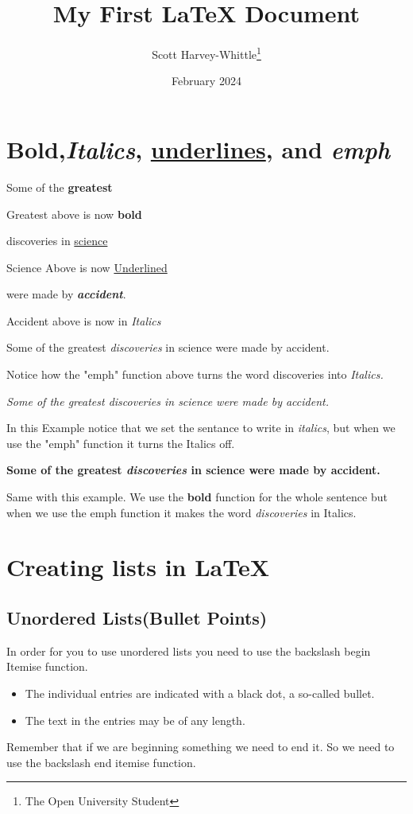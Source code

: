 \documentclass[12pt,a4paper]{article}
\title{My First \LaTeX{} Document}
\author{Scott Harvey-Whittle\thanks {The Open University Student}}
\date{February 2024}
\begin{document}
\maketitle

\section{\textbf{Bold},\textit{Italics}, \underline{underlines}, and \emph{emph}}
Some of the \textbf{greatest}

Greatest above is now \textbf{bold} 

discoveries in \underline{science} 

Science Above is now \underline{Underlined}

were made by \textbf{\textit{accident}}.

Accident above is now in \textit{Italics}


Some of the greatest \emph{discoveries} in science 
were made by accident.

Notice how the "emph" function above turns the word discoveries into  \emph{Italics.}

\textit{Some of the greatest \emph{discoveries} 
in science were made by accident.}

In this Example notice that we set the sentance to write in \textit{italics}, but when we use the "emph" function it turns the Italics off. 

\textbf{Some of the greatest \emph{discoveries} 
in science were made by accident.}

Same with this example. We use the \textbf{bold} function for the whole sentence but when we use the emph function it makes the word \textit{discoveries} in Italics.

\section{Creating lists in \LaTeX{}}

\subsection{Unordered Lists(Bullet Points)}

In order for you to use unordered lists you need to use the backslash begin Itemise function.

\begin{itemize}
  \item The individual entries are indicated with a black dot, a so-called bullet.
  \item The text in the entries may be of any length.
\end{itemize}
Remember that if we are beginning something we need to end it. So we need to use the backslash end itemise function. 
\end{document}
